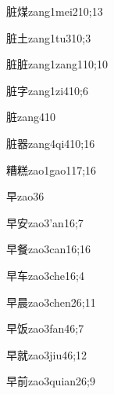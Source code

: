 \begin{verbete}{脏煤}{zang1mei2}{10;13}
\end{verbete}
\begin{verbete}{脏土}{zang1tu3}{10;3}
\end{verbete}
\begin{verbete}{脏脏}{zang1zang1}{10;10}
\end{verbete}
\begin{verbete}{脏字}{zang1zi4}{10;6}
\end{verbete}
\begin{verbete}{脏}{zang4}{10}
\end{verbete}
\begin{verbete}{脏器}{zang4qi4}{10;16}
\end{verbete}
\begin{verbete}{糟糕}{zao1gao1}{17;16}
\end{verbete}
\begin{verbete}{早}{zao3}{6}
\end{verbete}
\begin{verbete}{早安}{zao3'an1}{6;7}
\end{verbete}
\begin{verbete}{早餐}{zao3can1}{6;16}
\end{verbete}
\begin{verbete}{早车}{zao3che1}{6;4}
\end{verbete}
\begin{verbete}{早晨}{zao3chen2}{6;11}
\end{verbete}
\begin{verbete}{早饭}{zao3fan4}{6;7}
\end{verbete}
\begin{verbete}{早就}{zao3jiu4}{6;12}
\end{verbete}
\begin{verbete}{早前}{zao3quian2}{6;9}
\end{verbete}
